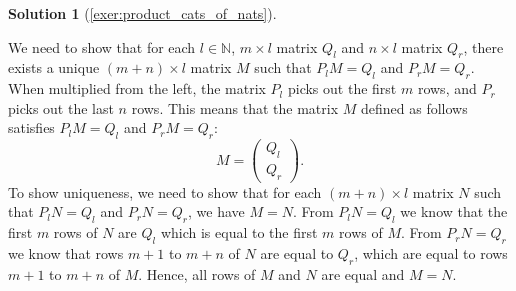 \documentclass[a4paper,11pt, oneside,titlepage=false]{scrbook}
\theoremstyle{plain}
\theoremstyle{definition}
\newtheorem{solution}[thm]{Solution}
\newcommand{\NN}{\ensuremath{\mathbb{N}}}
\begin{document}
\begin{solution}[\cref{exer:product_cats_of_nats}]
\begin{enumerate}
		We need to show that for each $l \in \NN$, $m \times l$ matrix $Q_l$ and $n \times l$ matrix $Q_r$, there exists a unique $(m + n) \times l$ matrix $M$ such that $P_l M = Q_l$ and $P_r M = Q_r$.
		When multiplied from the left, the matrix $P_l$ picks out the first $m$ rows, and $P_r$ picks out the last $n$ rows. This means that the matrix $M$ defined as follows satisfies $P_l M = Q_l$ and $P_r M = Q_r$:
		\[
		M =
		\begin{pmatrix}
			Q_l \\
			Q_r
		\end{pmatrix}.
		\]
		To show uniqueness, we need to show that for each $(m+n) \times l$ matrix $N$ such that $P_l N = Q_l$ and $P_r N = Q_r$, we have $M=N$.
		From $P_l N = Q_l$ we know that the first $m$ rows of $N$ are $Q_l$ which is equal to the first $m$ rows of $M$. From $P_r N = Q_r$ we know that rows $m+1$ to $m+n$ of $N$ are equal to $Q_r$, which are equal to rows $m+1$ to $m+n$ of $M$. Hence, all rows of $M$ and $N$ are equal and $M =N$.
	\end{enumerate}
\end{solution}
\end{document}
